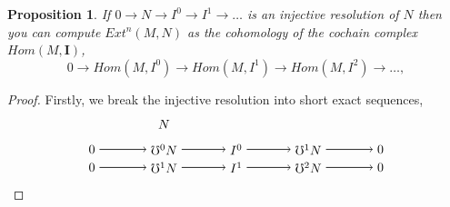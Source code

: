 \documentclass[11.5pt, twoside, a4paper, titlepage]{report}
\theoremstyle{definition}
\theoremstyle{plain}
\newtheorem{prop}[mydef]{Proposition}
\begin{document}
\begin{prop}
If $0\xrightarrow{}N \xrightarrow{} I^0 \xrightarrow{} I^1 \xrightarrow{} \dots $ is an injective resolution of $N$ then you can compute $Ext^n(M,N)$ as the cohomology of the cochain complex $Hom(M,\mathbf{I})$,
\begin{equation*}
0 \xrightarrow{} Hom(M,I^0) \xrightarrow{} Hom(M, I^1) \xrightarrow{} Hom(M,I^2) \xrightarrow{} \dots,
\end{equation*}
\end{prop}
\begin{proof}
Firstly, we break the injective resolution into short exact sequences,
\begin{equation*}
\begin{tikzpicture}[->,-latex, auto, main path/.style={->, semithick}, main node/.style={}]
\node	[main node]		(2) at (2,0)		{$0$};
\node	[main node]		(3) at (4,0)		{$\mho^0N$};
\node [main node]		(4) at (6,0)		{$I^0$};
\node [main node]		(5) at (8,0)		{$\mho^1N$};
\node	[main node]		(11) at (10,0)	{$0$};
\node [main node] 		(12) at (4, 0.7) 	{$N$};

\node	[main node]		(7) at (2,-0.5)	{$0$};
\node	[main node]		(8) at (4,-0.5)	{$\mho^1N$};
\node [main node]		(9) at (6,-0.5)	{$I^1$};
\node [main node]		(10) at (8,-0.5)	{$\mho^2N$};
\node [main node]		(13) at (10,-0.5)	{$0$};

\draw (2) edge [main path] node [auto] {$$} (3);
\draw (3) edge [main path] node [auto] {$$} (4);
\draw (4) edge [main path] node [auto] {$$} (5);
\draw (5) edge [main path] node [auto] {$$} (11);

\draw (7) edge [main path] node [auto] {$$} (8);
\path (8) edge [main path] node [auto, swap] {$$} (9);
\draw (9) edge [main path] node [auto, swap] {$$} (10);
\draw (10) edge [main path] node [auto, swap] {$$} (13);


\end{tikzpicture}
\end{equation*}
\end{proof}
\end{document}

